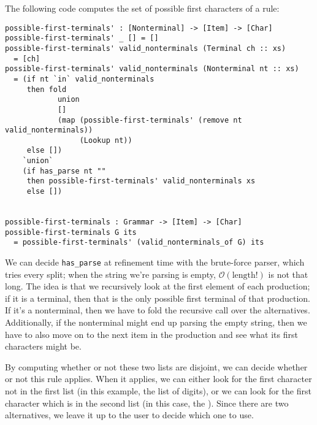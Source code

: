   The following code computes the set of possible first characters of a rule:
\begin{verbatim}
possible-first-terminals' : [Nonterminal] -> [Item] -> [Char]
possible-first-terminals' _ [] = []
possible-first-terminals' valid_nonterminals (Terminal ch :: xs)
  = [ch]
possible-first-terminals' valid_nonterminals (Nonterminal nt :: xs)
  = (if nt `in` valid_nonterminals
     then fold
            union
            []
            (map (possible-first-terminals' (remove nt valid_nonterminals))
                 (Lookup nt))
     else [])
    `union`
    (if has_parse nt ""
     then possible-first-terminals' valid_nonterminals xs
     else [])
     

possible-first-terminals : Grammar -> [Item] -> [Char]
possible-first-terminals G its
  = possible-first-terminals' (valid_nonterminals_of G) its
\end{verbatim}
   We can decide \verb|has_parse| at refinement time with the brute-force parser, which tries every split; when the string we're parsing is empty, $\mathcal O(\text{length}!)$ is not that long.  The idea is that we recursively look at the first element of each production; if it is a terminal, then that is the only possible first terminal of that production.  If it's a nonterminal, then we have to fold the recursive call over the alternatives.  Additionally, if the nonterminal might end up parsing the empty string, then we have to also move on to the next item in the production and see what its first characters might be.
   
   By computing whether or not these two lists are disjoint, we can decide whether or not this rule applies.  When it applies, we can either look for the first character not in the first list (in this example, the list of digits), or we can look for the first character which is in the second list (in this case, the \terminal{+}).  Since there are two alternatives, we leave it up to the user to decide which one to use.
   
